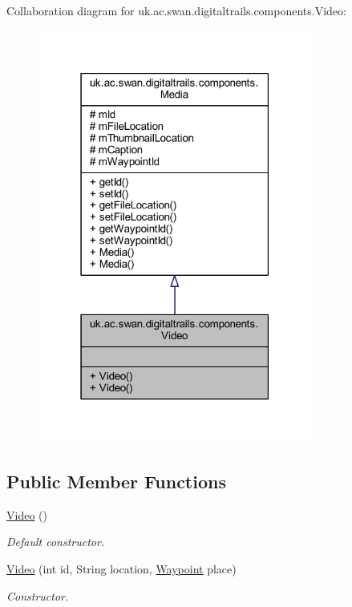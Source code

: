 Collaboration diagram for uk.\+ac.\+swan.\+digitaltrails.\+components.\+Video\+:
\nopagebreak
\begin{figure}[H]
\begin{center}
\leavevmode
\includegraphics[width=255pt]{classuk_1_1ac_1_1swan_1_1digitaltrails_1_1components_1_1_video__coll__graph}
\end{center}
\end{figure}
\subsection*{Public Member Functions}
\begin{DoxyCompactItemize}
\item 
\hyperlink{classuk_1_1ac_1_1swan_1_1digitaltrails_1_1components_1_1_video_a7aca2977a85dcc88aa87d9f40b3d7253}{Video} ()
\begin{DoxyCompactList}\small\item\em Default constructor. \end{DoxyCompactList}\item 
\hyperlink{classuk_1_1ac_1_1swan_1_1digitaltrails_1_1components_1_1_video_a46516e51854cabe75326b27a883807f5}{Video} (int id, String location, \hyperlink{classuk_1_1ac_1_1swan_1_1digitaltrails_1_1components_1_1_waypoint}{Waypoint} place)
\begin{DoxyCompactList}\small\item\em Constructor. \end{DoxyCompactList}\end{DoxyCompactItemize}
